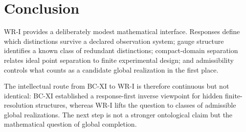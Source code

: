 \documentclass[11pt]{article}
\begin{document}
\section*{Conclusion}

WR-I provides a deliberately modest mathematical interface. Responses define
which distinctions survive a declared observation system; gauge structure
identifies a known class of redundant distinctions; compact-domain separation
relates ideal point separation to finite experimental design; and admissibility
controls what counts as a candidate global realization in the first place.

The intellectual route from BC-XI to WR-I is therefore continuous but not
identical: BC-XI established a response-first inverse viewpoint for hidden
finite-resolution structures, whereas WR-I lifts the question to classes of
admissible global realizations. The next step is not a stronger ontological
claim but the mathematical question of global completion.
\end{document}
